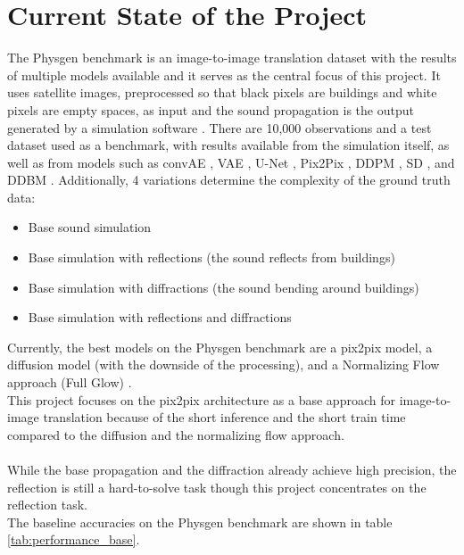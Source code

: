 	\section{Current State of the Project}
	\label{sec:intro-problem}
		The Physgen benchmark is an image-to-image translation dataset with the results of multiple models available and it serves as the central focus of this project. It uses satellite images, preprocessed so that black pixels are buildings and white pixels are empty spaces, as input and the sound propagation is the output generated by a simulation software \cite{spitznagel_urban_2024-1}\cite{martin_spitznagel_physicsgen_2025}. There are 10,000 observations and a test dataset used as a benchmark, with results available from the simulation itself, as well as from models such as convAE \cite{dong2017learningdeeprepresentationsusing}, VAE \cite{Kingma_2019}, U-Net \cite{ronneberger_u-net_2015}, Pix2Pix \cite{isola_image--image_2016}, DDPM \cite{DBLP:journals/corr/abs-2006-11239}, SD \cite{DBLP:journals/corr/abs-2112-10752}, and DDBM \cite{zhou2023denoisingdiffusionbridgemodels}. Additionally, 4 variations determine the complexity of the ground truth data:
		\begin{itemize}[itemsep=1mm, parsep=0pt]
			\item Base sound simulation
			\item Base simulation with reflections (the sound reflects from buildings)
			\item Base simulation with diffractions (the sound bending around buildings)
			\item Base simulation with reflections and diffractions
		\end{itemize}
		
		\clearpage
		Currently, the best models on the Physgen benchmark are a pix2pix model, a diffusion model (with the downside of the processing), and a Normalizing Flow approach (Full Glow) \cite{martin_spitznagel_physicsgen_2025}\cite{achim_eckerle_evaluierung_2025}.\\
		This project focuses on the pix2pix architecture as a base approach for image-to-image translation because of the short inference and the short train time compared to the diffusion and the normalizing flow approach.\\
		\\
		While the base propagation and the diffraction already achieve high precision, the reflection is still a hard-to-solve task though this project concentrates on the reflection task. \\
		The baseline accuracies on the Physgen benchmark are shown in table \ref{tab:performance_base}.
		
